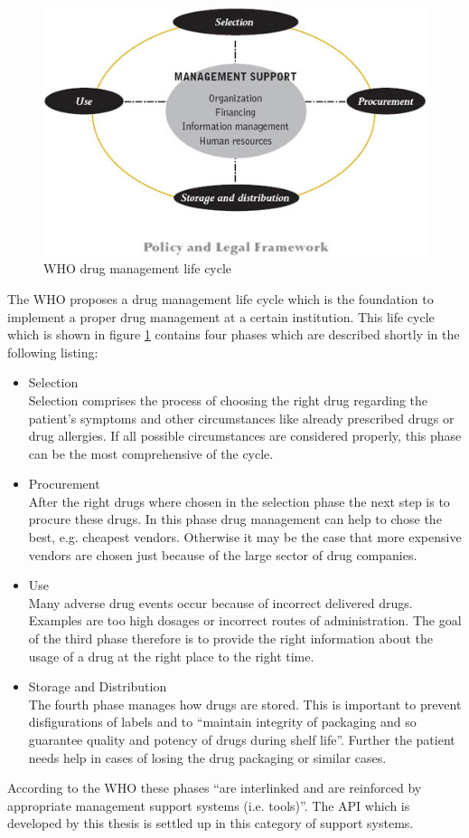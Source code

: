\begin{figure}
  \centering
  \includegraphics[scale=2]{preliminaries/life_cycle.jpg}
  \caption{WHO drug management life cycle}
  \label{fig:life_cycle}
\end{figure}
The WHO proposes a drug management life cycle which is the foundation to implement a proper drug management at a certain institution.
This life cycle which is shown in figure \ref{fig:life_cycle} contains four phases which are described shortly in the following listing:
\begin{itemize}
\item Selection\\
  Selection comprises the process of choosing the right drug regarding the patient's symptoms and other circumstances like already prescribed drugs or drug allergies.
  If all possible circumstances are considered properly, this phase can be the most comprehensive of the cycle.
\item Procurement\\
  After the right drugs where chosen in the selection phase the next step is to procure these drugs.
  In this phase drug management can help to chose the best, e.g. cheapest vendors.
  Otherwise it may be the case that more expensive vendors are chosen just because of the large sector of drug companies.
\item Use\\
  Many adverse drug events occur because of incorrect delivered drugs.
  Examples are too high dosages or incorrect routes of administration.
  The goal of the third phase therefore is to provide the right information about the usage of a drug at the right place to the right time.
\item Storage and Distribution\\
  The fourth phase manages how drugs are stored.
  This is important to prevent disfigurations of labels and to ``maintain integrity of packaging and so guarantee quality and potency of drugs during shelf life''.
  Further the patient needs help in cases of losing the drug packaging or similar cases.
\end{itemize}
According to the WHO these phases ``are interlinked and are reinforced by appropriate management support systems (i.e. tools)''.
The API which is developed by this thesis is settled up in this category of support systems.


